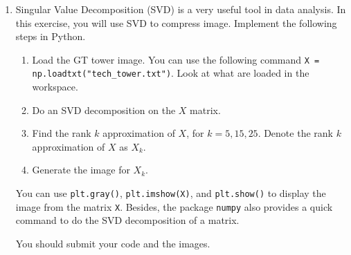 \documentclass[11pt]{article}
\newcommand{\mb}[1]{\ensuremath{\boldsymbol{#1}}}
\begin{document}
\begin{enumerate}
We compute the constraint coefficients:
\begin{align*}
\mb{d}_\alpha^T \mb{x}_\alpha^1 &= (2, -1)(1, 2)^T = 2 - 2 = 0, \\
\mb{d}_\alpha^T \mb{x}_\alpha^2 &= (2, -1)(2, 0)^T = 4 - 0 = 4, \\
\mb{d}_\beta^T \mb{x}_\beta^1 &= (1, 3)(0, 5)^T = 0 + 15 = 15, \\
\mb{d}_\beta^T \mb{x}_\beta^2 &= (1, 3)(1, 0)^T = 1 + 0 = 1.
\end{align*}

Therefore, the restricted master problem is:
\begin{align*}
\min \quad & 10\alpha_1 + 8\alpha_2 + 10\beta_1 + \beta_2 \\
\text{s.t.} \quad & 0 \cdot \alpha_1 + 4\alpha_2 + 15\beta_1 + \beta_2 \leq 6, \\
                       & \alpha_1 + \alpha_2 = 1, \\
                       & \beta_1 + \beta_2 = 1, \\
                       & \alpha_1, \alpha_2, \beta_1, \beta_2 \geq 0.
\end{align*}

\section*{Image compression and SVD}
\item Singular Value Decomposition (SVD) is a very useful tool in data analysis. In this exercise, you will use SVD to compress image. Implement the following steps in Python.
\begin{enumerate}
	\item Load the GT tower image. You can use the following command \verb|X = np.loadtxt("tech_tower.txt")|. Look at what are loaded in the workspace.
	\item Do an SVD decomposition on the $X$ matrix. 
	\item Find the rank $k$ approximation of $X$, for $k=5, 15, 25$. Denote the rank $k$ approximation of $X$ as $X_k$.
	\item Generate the image for $X_k.$ 
\end{enumerate}

You can use \verb|plt.gray()|, \verb|plt.imshow(X)|, and \verb|plt.show()| to display the image from the matrix \texttt{X}. Besides, the package \texttt{numpy} also provides a quick command to do the SVD decomposition of a matrix.

You should submit your code and the images.


\end{enumerate}
\end{document}
